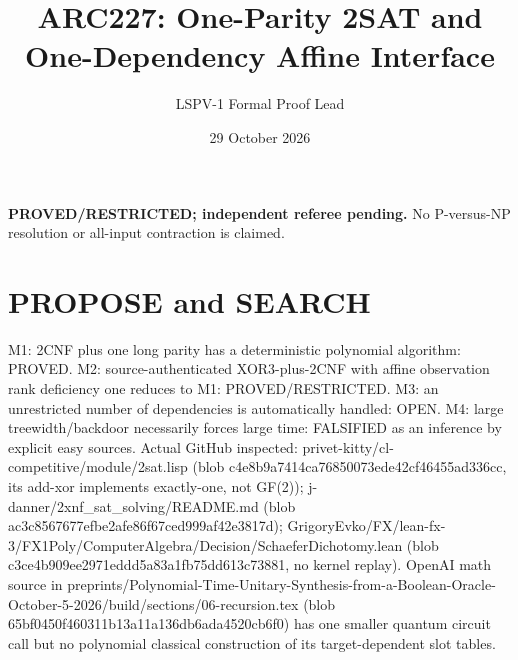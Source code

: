 \documentclass[11pt]{article}
\title{ARC227: One-Parity 2SAT and One-Dependency Affine Interface}
\author{LSPV-1 Formal Proof Lead}
\date{29 October 2026}
\begin{document}
\maketitle
\noindent\textbf{PROVED/RESTRICTED; independent referee pending.}
No P-versus-NP resolution or all-input contraction is claimed.
\section{PROPOSE and SEARCH}
M1: 2CNF plus one long parity has a deterministic polynomial algorithm:
PROVED. M2: source-authenticated XOR3-plus-2CNF with affine observation
rank deficiency one reduces to M1: PROVED/RESTRICTED.
M3: an unrestricted number of dependencies is automatically handled: OPEN.
M4: large treewidth/backdoor necessarily forces large time:
FALSIFIED as an inference by explicit easy sources.
Actual GitHub inspected: privet-kitty/cl-competitive/module/2sat.lisp
(blob c4e8b9a7414ca76850073ede42cf46455ad336cc, its add-xor
implements exactly-one, not GF(2)); j-danner/2xnf_sat_solving/README.md
(blob ac3c8567677efbe2afe86f67ced999af42e3817d);
GrigoryEvko/FX/lean-fx-3/FX1Poly/ComputerAlgebra/Decision/SchaeferDichotomy.lean
(blob c3ce4b909ee2971eddd5a83a1fb75dd613c73881, no kernel replay).
OpenAI math source in preprints/Polynomial-Time-Unitary-Synthesis-from-a-Boolean-Oracle-October-5-2026/build/sections/06-recursion.tex
(blob 65bf0450f460311b13a11a136db6ada4520cb6f0)
has one smaller quantum circuit call but no polynomial classical
construction of its target-dependent slot tables.
\end{document}
